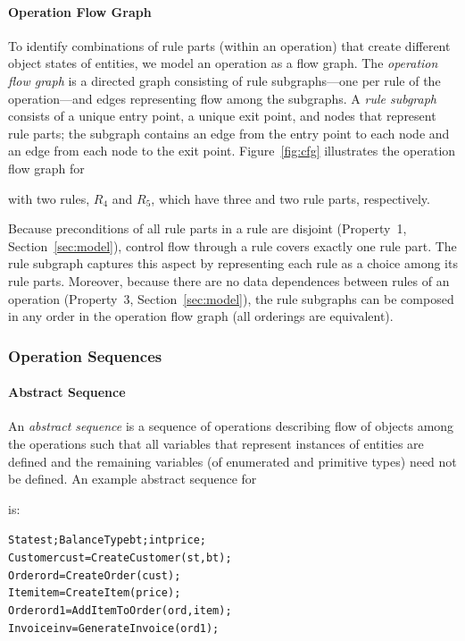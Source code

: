 \paragraph*{Operation Flow Graph} To identify combinations of rule parts (within
an operation) that create different object states of entities, we model an
operation as a flow graph. The \textit{operation flow graph} is a directed graph
consisting of rule subgraphs---one per rule of the operation---and edges
representing flow among the subgraphs. A \textit{rule subgraph} consists of a
unique entry point, a unique exit point, and nodes that represent rule parts;
the subgraph contains an edge from the entry point to each node and an edge from
each node to the exit point.  Figure~\ref{fig:cfg} illustrates the operation
flow graph for \subject{GenerateInvoice} with two rules, $R_4$ and $R_5$, which
have three and two rule parts, respectively.

Because preconditions of all rule parts in a rule are disjoint (Property~1,
Section~\ref{sec:model}), control flow through a rule covers exactly one rule
part.  The rule subgraph captures this aspect by representing each rule as a
choice among its rule parts. Moreover, because there are no data dependences
between rules of an operation (Property~3, Section~\ref{sec:model}), the rule
subgraphs can be composed in any order in the operation flow graph (\ie all
orderings are equivalent).

\subsubsection{Operation Sequences}

\paragraph*{Abstract Sequence} An \textit{abstract sequence} is a sequence of
operations describing flow of objects among the operations such that all
variables that represent instances of entities are defined and the remaining
variables (of enumerated and primitive types) need not be defined. An example
abstract sequence for \subject{GenerateInvoice} is:

\vspace*{-4pt}
{\scriptsize
\begin{alltt} 
 State st; BalanceType bt; int price;
 Customer cust = CreateCustomer(st, bt);
 Order ord = CreateOrder(cust);	 
 Item item = CreateItem(price);
 Order ord1 = AddItemToOrder(ord, item);
 Invoice inv = GenerateInvoice(ord1);  
\end{alltt}
}
\vspace*{-4pt}

